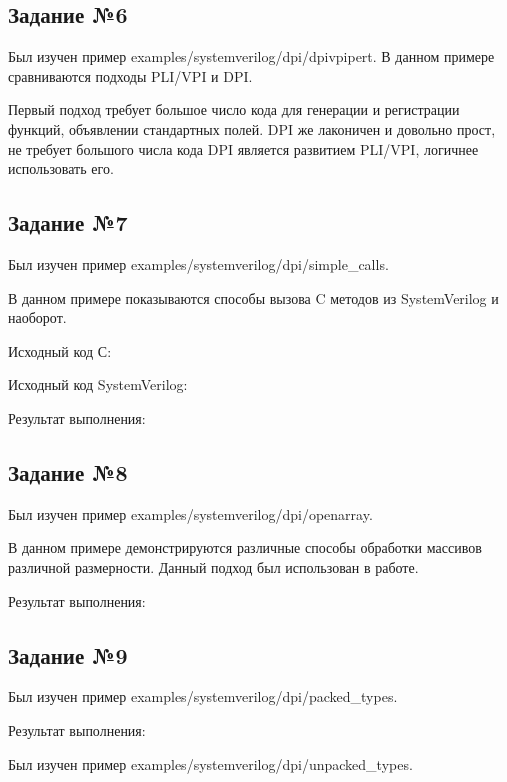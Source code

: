 \documentclass[a4paper,14pt]{article}
\begin{document}
    \subsection{Задание №6}

    Был изучен пример examples/systemverilog/dpi/dpivpipert.
    В данном примере сравниваются подходы PLI/VPI и DPI.

    Первый подход требует большое число кода для генерации и регистрации функций, объявлении стандартных полей.
    DPI же лаконичен и довольно прост, не требует большого числа кода
    DPI является развитием PLI/VPI, логичнее использовать его.

    \subsection{Задание №7}

    Был изучен пример examples/systemverilog/dpi/simple\_calls.

    В данном примере показываются способы вызова C методов из SystemVerilog и наоборот.

    Исходный код С:
    {\small {}}

    Исходный код SystemVerilog:
    {\small {}}

    Результат выполнения:
    {\small {}}

    \subsection{Задание №8}

    Был изучен пример examples/systemverilog/dpi/openarray.

    В данном примере демонстрируются различные способы обработки массивов различной размерности.
    Данный подход был использован в работе.

    Результат выполнения:
    {\small {}}

    \subsection{Задание №9}

    Был изучен пример examples/systemverilog/dpi/packed\_types.

    Результат выполнения:
    {\small {}}

    Был изучен пример examples/systemverilog/dpi/unpacked\_types.
\end{document}
